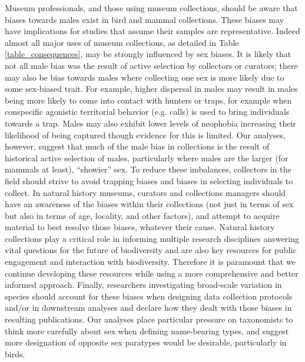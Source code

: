 \documentclass[a4paper, 12pt]{article}
\begin{document}
Museum professionals, and those using museum collections, should be aware that biases towards males exist in bird and mammal collections. 
These biases may have implications for studies that assume their samples are representative. Indeed almost all major uses of museum collections, as detailed in Table \ref{table_consequences}, may be strongly influenced by sex biases. 
It is likely that not all male bias was the result of active selection by collectors or curators; there may also be bias towards males where collecting one sex is more likely due to some sex-biased trait. 
For example, higher dispersal in males may result in males being more likely to come into contact with hunters or traps, for example when conspecific agonistic territorial behavior (e.g. calls) is used to bring individuals towards a trap. 
Males may also exhibit lower levels of neophobia increasing their likelihood of being captured though evidence for this is limited\cite{crane2017patterns,laviola1992sexual}. 
Our analyses, however, suggest that much of the male bias in collections is the result of historical active selection of males, particularly where males are the larger (for mammals at least), ``showier'' sex. 
To reduce these imbalances, collectors in the field should strive to avoid trapping biases and biases in selecting individuals to collect. 
In natural history museums, curators and collections managers should have an awareness of the biases within their collections (not just in terms of sex but also in terms of age, locality, and other factors), and attempt to acquire material to best resolve those biases, whatever their cause. 
Natural history collections play a critical role in informing multiple research disciplines answering vital questions for the future of biodiversity\cite{meineke2018biological} and are also key resources for public engagement and interaction with biodiversity\cite{machin2008}. 
Therefore it is paramount that we continue developing these resources while using a more comprehensive and better informed approach. 
Finally, researchers investigating broad-scale variation in species should account for these biases when designing data collection protocols and/or in downstream analyses and declare how they dealt with those biases in resulting publications. 
Our analyses place particular pressure on taxonomists to think more carefully about sex when defining name-bearing types, and suggest more designation of opposite sex paratypes would be desirable, particularly in birds. 
\end{document}
